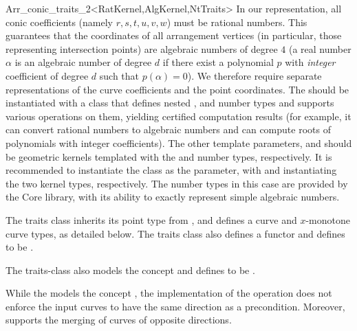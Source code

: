\begin{ccRefClass}{Arr_conic_traits_2<RatKernel,AlgKernel,NtTraits>}
In our representation, all conic coefficients (namely $r, s, t, u, v, w$)
must be rational numbers. This guarantees that the coordinates of all
arrangement vertices (in particular, those representing intersection
points) are algebraic numbers of degree $4$ (a real number $\alpha$
is an algebraic number of degree $d$ if there exist a polynomial $p$ with
{\sl integer} coefficient of degree $d$ such that $p(\alpha) = 0$).
We therefore require separate representations of the curve coefficients and
the point coordinates. The  should be instantiated with a class
that defines nested ,  and 
number types and supports various operations on them, yielding certified
computation results (for example, it can convert rational numbers to algebraic
numbers and can compute roots of polynomials with integer coefficients).
The other template parameters,  and  should be
geometric kernels templated with the  and
 number types, respectively.
It is recommended to instantiate the 
class as the  parameter, with
 and 
instantiating the two kernel types, respectively.
The number types in this case are provided by the {\sc Core} library, with its
ability to exactly represent simple algebraic numbers.

The traits class inherits its point type from ,
and defines a curve and $x$-monotone curve types, as detailed below.
The traits class also defines a  functor and
defines  to be .

The traits-class also models the  concept
and defines  to
be .

While the \ccRefName{} models the concept
, the implementation of
the  operation does not enforce the input curves
to have the same direction as a precondition. Moreover, \ccRefName{}
supports the merging of curves of opposite directions.

 
\ccIsModel
    \\
    \\


\end{ccRefClass}
